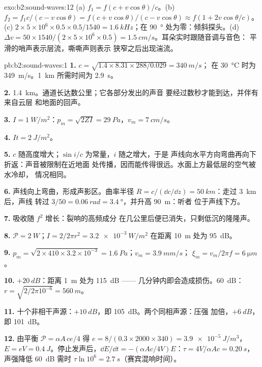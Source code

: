 \begin{solution}{exo:b2:sound-waves:12}
(a) $f_1 = f(c + v\cos\theta)/c$。(b) $f_2 = f_1c/(c - v\cos\theta) = f(c + v\cos\theta)
/(c - v\cos\theta) \approx f(1 + 2v\cos\theta/c)$。(c) $2 \times 5 \times 10^6 \times 0.5 \times 0.5/1540
= \qty{1.6}{kHz}$；在 \qty{90}{\degree} 处为零：倾斜探头。(d) $\Delta v = 50 \times 1540/
(2 \times 5 \times 10^6 \times 0.5) = \qty{1.5}{cm/s}$。耳朵实时跟随音调与音色：
平滑的哨声表示层流，嘶嘶声则表示
狭窄之后出现湍流。
\end{solution}

\begin{solution}{pb:b2:sound-waves:1}
\textbf{1.} $c = \sqrt{1.4 \times 8.31 \times 288/0.029} = \qty{340}{m/s}$；
在 \qty{30}{\degreeCelsius} 时为 \qty{349}{m/s}。\qty{1}{km} 所需时间为 \qty{2.9}{s}。

\textbf{2.} \qty{1.4}{km}。通道长达数公里；它各部分发出的声音
要经过数秒才能到达，并伴有来自云层
和地面的回声。

\textbf{3.} $I = \qty{1}{W/m^2}$：$p_m = \sqrt{2ZI} = \qty{29}{Pa}$，$v_m = \qty{7}{cm/s}$。

\textbf{4.} $It = \qty{2}{J/m^2}$。

\textbf{5.} $c$ 随高度增大；$\sin i/c$ 为常量，$i$ 随之增大，于是
声线向水平方向弯曲再向下折返：声音被限制在近地面
处传播，因而能传得很远。水面上方最低层的空气被水冷却，
情况相同。

\textbf{6.} 声线向上弯曲，形成声影区。曲率半径
$R = c/(\dd c/\dd z) = \qty{50}{km}$：走过 \qty{3}{km} 后，声线
转过 $3/50 = \qty{0.06}{rad} = \qty{3.4}{\degree}$，并升高 \qty{90}{m}：听者
位于声线下方。

\textbf{7.} 吸收随 $f^2$ 增长：裂响的高频成分
在几公里后便已消失，只剩低沉的隆隆声。

\textbf{8.} $\mathcal P = \qty{2}{W}$；$I = 2/2\pi r^2 = \qty{3.2e-3}{W/m^2}$ 在距离 \qty{10}{m} 处为
\qty{95}{dB}。

\textbf{9.} $p_m = \sqrt{2 \times 410 \times 3.2 \times 10^{-3}} = \qty{1.6}{Pa}$；$v_m = \qty{3.9}{mm/s}$；
$\xi_m = v_m/2\pi f = \qty{6}{\micro m}$。

\textbf{10.} $+\qty{20}{dB}$：距离 \qty{1}{m} 处为 \qty{115}{dB} ——
几分钟内即会造成损伤。\qty{60}{dB}：$r = \sqrt{2/2\pi10^{-6}} = \qty{560}{m}$。

\textbf{11.} 十个非相干声源：$+\qty{10}{dB}$，即 \qty{105}{dB}。两个同相声源：压强
加倍，$+\qty{6}{dB}$，即 \qty{101}{dB}。

\textbf{12.} 由平衡 $\mathcal P = \alpha A\,ce/4$ 得 $e = 8/(0.3 \times 2000 \times 340) =
\qty{3.9e-5}{J/m^3}$，$E = eV = \qty{0.4}{J}$。停止发声后，$\dd E/\dd t = -(\alpha Ac
/4V)E$：$\tau = 4V/\alpha Ac = \qty{0.20}{s}$，声强降低 \qty{60}{dB} 需时 $\tau\ln10^6 =
\qty{2.7}{s}$（赛宾混响时间）。


\end{solution}
